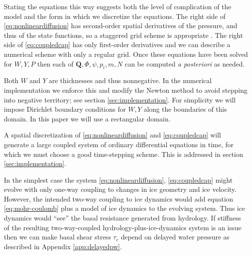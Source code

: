 \documentclass[11pt]{amsart}
\newcommand{\bQ}{\mathbf{Q}}
\begin{document}
Stating the equations this way suggests both the level of complication of the model and the form in which we discretize the equations.  The right side of \eqref{eq:nonlineardiffusion} has second-order spatial derivatives of the pressure, and thus of the state functions, so a staggered grid scheme is appropriate \citep{MortonMayers}.  The right side of \eqref{eq:coupledcap} has only first-order derivatives and we can describe a numerical scheme with only a regular grid.  Once these equations have been solved for $W,Y,P$ then each of $\bQ,\Phi,\psi,p_i,m,N$ can be computed \emph{a posteriori} as needed.

Both $W$ and $Y$ are thicknesses and thus nonnegative.  In the numerical implementation we enforce this and modify the Newton method to avoid stepping into negative territory; see section \ref{sec:implementation}.  For simplicity we will impose Dirichlet boundary conditions for $W,Y$ along the boundaries of this domain.  In this paper we will use a rectangular domain.

A spatial discretization of \eqref{eq:nonlineardiffusion} and \eqref{eq:coupledcap} will generate a large coupled system of ordinary differential equations in time, for which we must choose a good time-stepping scheme.  This is addressed in section \ref{sec:implementation}.

In the simplest case the system \eqref{eq:nonlineardiffusion}, \eqref{eq:coupledcap} might evolve with only one-way coupling to changes in ice geometry and ice velocity.  However, the intended two-way coupling to ice dynamics would add equation \eqref{eq:mohr-coulomb} plus a model of ice dynamics to the evolving system.  Thus ice dynamics would ``see'' the basal resistance generated from hydrology.  If stiffness of the resulting two-way-coupled hydrology-plus-ice-dynamics system is an issue then we can make basal shear stress $\tau_c$ depend on delayed water pressure as described in Appendix \ref{app:delayedpw}.
\end{document}
